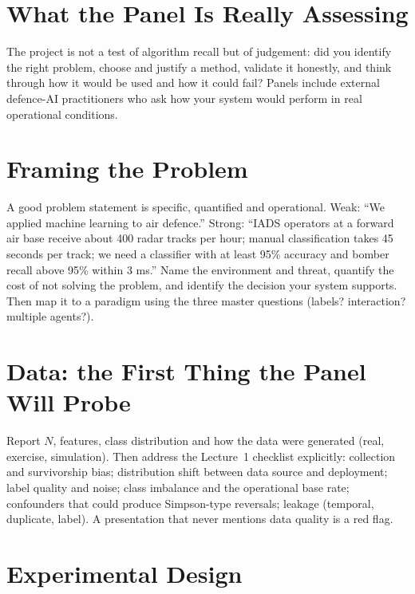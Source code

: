 \documentclass[11pt]{article}
\begin{document}
\tableofcontents
\newpage

\section{What the Panel Is Really Assessing}
The project is not a test of algorithm recall but of judgement: did you identify the right problem, choose and justify a method, validate it honestly, and think through how it would be used and how it could fail? Panels include external defence-AI practitioners who ask how your system would perform in real operational conditions.

\section{Framing the Problem}
A good problem statement is specific, quantified and operational. Weak: ``We applied machine learning to air defence.'' Strong: ``IADS operators at a forward air base receive about 400 radar tracks per hour; manual classification takes 45 seconds per track; we need a classifier with at least 95\% accuracy and bomber recall above 95\% within 3 ms.'' Name the environment and threat, quantify the cost of not solving the problem, and identify the decision your system supports. Then map it to a paradigm using the three master questions (labels? interaction? multiple agents?).

\section{Data: the First Thing the Panel Will Probe}
Report $N$, features, class distribution and how the data were generated (real, exercise, simulation). Then address the Lecture~1 checklist explicitly: collection and survivorship bias; distribution shift between data source and deployment; label quality and noise; class imbalance and the operational base rate; confounders that could produce Simpson-type reversals; leakage (temporal, duplicate, label). A presentation that never mentions data quality is a red flag.

\section{Experimental Design}
\end{document}
